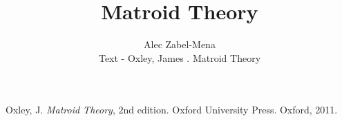\documentclass[12pt]{book}
\date{}
\title{Matroid Theory}
\author{Alec Zabel-Mena \\ Text - Oxley, James . Matroid Theory}
\newcommand{\ita}[1]{\textit{#1}}
\theoremstyle{plain}
\theoremstyle{definition}
\theoremstyle{remark}
\begin{document}
\maketitle



\pagebreak
\begin{thebibliography}{}

Oxley, J. \ita{Matroid Theory}, $2$nd edition. Oxford University Press. Oxford,
2011.

\end{thebibliography}
\end{document}
